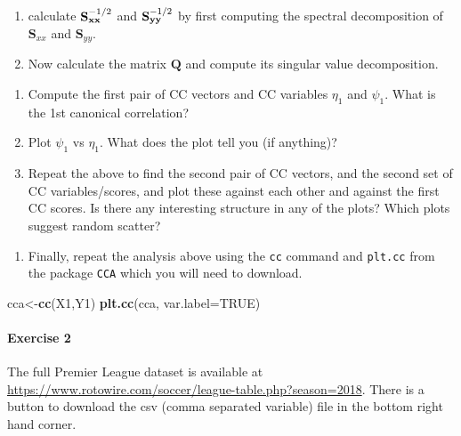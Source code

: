 \documentclass[]{book}
\newenvironment{Shaded}{\begin{snugshade}}{\end{snugshade}}
\newcommand{\DataTypeTok}[1]{\textcolor[rgb]{0.13,0.29,0.53}{#1}}
\newcommand{\KeywordTok}[1]{\textcolor[rgb]{0.13,0.29,0.53}{\textbf{#1}}}
\newcommand{\NormalTok}[1]{#1}
\newcommand{\OtherTok}[1]{\textcolor[rgb]{0.56,0.35,0.01}{#1}}
\providecommand{\tightlist}{%
  \setlength{\itemsep}{0pt}\setlength{\parskip}{0pt}}
\let\oldparagraph\paragraph
\renewcommand{\paragraph}[1]{\oldparagraph{#1}\mbox{}}
\theoremstyle{definition}
\theoremstyle{definition}
\theoremstyle{definition}
\theoremstyle{remark}
\begin{document}
\begin{enumerate}
\def\labelenumi{\roman{enumi}.}
\item
  calculate \({\bf S}_{\bf x x}^{-1/2}\) and \({\bf S}_{\bf yy}^{-1/2}\) by first computing the spectral decomposition of \(\mathbf S_{xx}\) and \(\mathbf S_{yy}\).
\item
  Now calculate the matrix \(\mathbf Q\) and compute its singular value decomposition.
\end{enumerate}

\begin{enumerate}
\def\labelenumi{\roman{enumi}.}
\setcounter{enumi}{2}
\item
  Compute the first pair of CC vectors and CC variables \(\eta_1\) and \(\psi_1\). What is the 1st canonical correlation?
\item
  Plot \(\psi_1\) vs \(\eta_1\). What does the plot tell you (if anything)?
\item
  Repeat the above to find the second pair of CC vectors, and the second set of CC variables/scores, and plot these against each other and against the first CC scores. Is there any interesting structure in any of the plots? Which plots suggest random scatter?
\end{enumerate}

\begin{enumerate}
\def\labelenumi{\roman{enumi}.}
\setcounter{enumi}{5}
\tightlist
\item
  Finally, repeat the analysis above using the \texttt{cc} command and \texttt{plt.cc} from the package \texttt{CCA} which you will need to download.
\end{enumerate}

\begin{Shaded}
\begin{Highlighting}[]
\NormalTok{cca<-}\KeywordTok{cc}\NormalTok{(X1,Y1)}
\KeywordTok{plt.cc}\NormalTok{(cca, }\DataTypeTok{var.label=}\OtherTok{TRUE}\NormalTok{)}
\end{Highlighting}
\end{Shaded}

\hypertarget{exercise-2-1}{%
\paragraph{Exercise 2}\label{exercise-2-1}}

The full Premier League dataset is available at
\href{https://www.rotowire.com/soccer/league-table.php?season=2019}{https://www.rotowire.com/soccer/league-table.php?season=2018}. There is a button to download the csv (comma separated variable) file in the bottom right hand corner.
\end{document}
